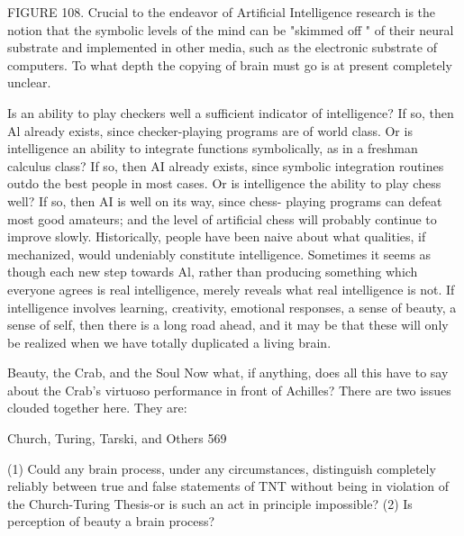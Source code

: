 {FIGURE 108. Crucial to the endeavor of Artificial Intelligence research is the notion that
the symbolic levels of the mind can be "skimmed off " of their neural substrate and
implemented in other media, such as the electronic substrate of computers. To what depth
the copying of brain must go is at present completely unclear.

         Is an ability to play checkers well a sufficient indicator of intelligence? If so, then
Al already exists, since checker-playing programs are of world class. Or is intelligence an
ability to integrate functions symbolically, as in a freshman calculus class? If so, then AI
already exists, since symbolic integration routines outdo the best people in most cases. Or
is intelligence the ability to play chess well? If so, then AI is well on its way, since chess-
playing programs can defeat most good amateurs; and the level of artificial chess will
probably continue to improve slowly.
         Historically, people have been naive about what qualities, if mechanized, would
undeniably constitute intelligence. Sometimes it seems as though each new step towards
Al, rather than producing something which everyone agrees is real intelligence, merely
reveals what real intelligence is not. If intelligence involves learning, creativity,
emotional responses, a sense of beauty, a sense of self, then there is a long road ahead,
and it may be that these will only be realized when we have totally duplicated a living
brain.

                           Beauty, the Crab, and the Soul
Now what, if anything, does all this have to say about the Crab's virtuoso performance in
front of Achilles? There are two issues clouded together here. They are:




Church, Turing, Tarski, and Others                                                         569

   (1) Could any brain process, under any circumstances, distinguish completely
     reliably between true and false statements of TNT without being in violation of
     the Church-Turing Thesis-or is such an act in principle impossible?
   (2) Is perception of beauty a brain process?

}
